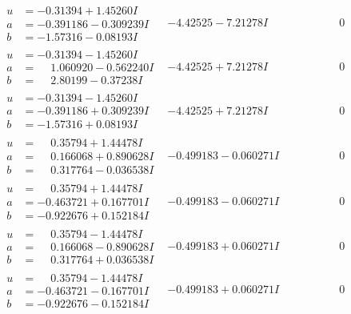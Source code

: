 \documentclass[1p]{elsarticle_modified}
\theoremstyle{definition}
\begin{document}
$$\begin{array}{c|c|c}
\begin{aligned}
u &= -0.31394 + 1.45260 I \\
a &= -0.391186 - 0.309239 I \\
b &= -1.57316 - 0.08193 I\end{aligned}
 & -4.42525 - 7.21278 I & \phantom{-0.000000 } 0 \\ \hline\begin{aligned}
u &= -0.31394 - 1.45260 I \\
a &= \phantom{-}1.060920 - 0.562240 I \\
b &= \phantom{-}2.80199 - 0.37238 I\end{aligned}
 & -4.42525 + 7.21278 I & \phantom{-0.000000 } 0 \\ \hline\begin{aligned}
u &= -0.31394 - 1.45260 I \\
a &= -0.391186 + 0.309239 I \\
b &= -1.57316 + 0.08193 I\end{aligned}
 & -4.42525 + 7.21278 I & \phantom{-0.000000 } 0 \\ \hline\begin{aligned}
u &= \phantom{-}0.35794 + 1.44478 I \\
a &= \phantom{-}0.166068 + 0.890628 I \\
b &= \phantom{-}0.317764 - 0.036538 I\end{aligned}
 & -0.499183 - 0.060271 I & \phantom{-0.000000 } 0 \\ \hline\begin{aligned}
u &= \phantom{-}0.35794 + 1.44478 I \\
a &= -0.463721 + 0.167701 I \\
b &= -0.922676 + 0.152184 I\end{aligned}
 & -0.499183 - 0.060271 I & \phantom{-0.000000 } 0 \\ \hline\begin{aligned}
u &= \phantom{-}0.35794 - 1.44478 I \\
a &= \phantom{-}0.166068 - 0.890628 I \\
b &= \phantom{-}0.317764 + 0.036538 I\end{aligned}
 & -0.499183 + 0.060271 I & \phantom{-0.000000 } 0 \\ \hline\begin{aligned}
u &= \phantom{-}0.35794 - 1.44478 I \\
a &= -0.463721 - 0.167701 I \\
b &= -0.922676 - 0.152184 I\end{aligned}
 & -0.499183 + 0.060271 I & \phantom{-0.000000 } 0 \\ \hline\begin{aligned}

\end{aligned}
\end{array}$$
\end{document}

